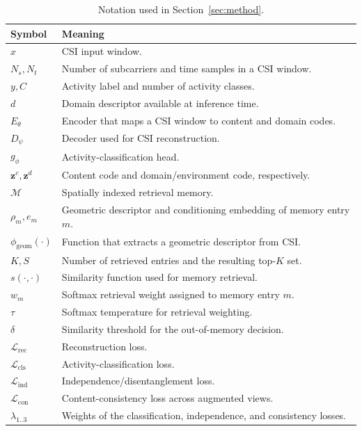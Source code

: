 \documentclass[conference]{IEEEtran}
\newcommand{\zc}{\mathbf{z}^{c}}      %
\newcommand{\zd}{\mathbf{z}^{d}}      %
\begin{document}
\begin{table}[t]
\centering
\caption{Notation used in Section~\ref{sec:method}.}
\label{tab:notation}
\small
\begin{tabular}{p{}p{}}
\toprule
\textbf{Symbol} & \textbf{Meaning} \\
\midrule
$x$ & CSI input window. \\
$N_s, N_t$ & Number of subcarriers and time samples in a CSI window. \\
$y, C$ & Activity label and number of activity classes. \\
$d$ & Domain descriptor available at inference time. \\
$E_\theta$ & Encoder that maps a CSI window to content and domain codes. \\
$D_\psi$ & Decoder used for CSI reconstruction. \\
$g_\phi$ & Activity-classification head. \\
$\zc, \zd$ & Content code and domain/environment code, respectively. \\
$\mathcal{M}$ & Spatially indexed retrieval memory. \\
$\rho_m, e_m$ & Geometric descriptor and conditioning embedding of memory entry $m$. \\
$\phi_{\mathrm{geom}}(\cdot)$ & Function that extracts a geometric descriptor from CSI. \\
$K, S$ & Number of retrieved entries and the resulting top-$K$ set. \\
$s(\cdot,\cdot)$ & Similarity function used for memory retrieval. \\
$w_m$ & Softmax retrieval weight assigned to memory entry $m$. \\
$\tau$ & Softmax temperature for retrieval weighting. \\
$\delta$ & Similarity threshold for the out-of-memory decision. \\
$\mathcal{L}_{\mathrm{rec}}$ & Reconstruction loss. \\
$\mathcal{L}_{\mathrm{cls}}$ & Activity-classification loss. \\
$\mathcal{L}_{\mathrm{ind}}$ & Independence/disentanglement loss. \\
$\mathcal{L}_{\mathrm{con}}$ & Content-consistency loss across augmented views. \\
$\lambda_{1..3}$ & Weights of the classification, independence, and consistency losses. \\
\bottomrule
\end{tabular}
\end{table}
\end{document}
